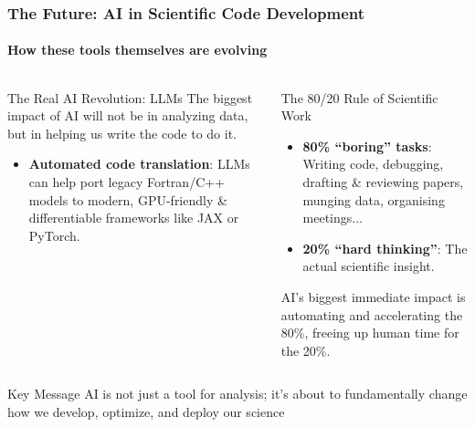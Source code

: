 \documentclass[aspectratio=169]{beamer}
\newcommand{\keyterm}[1]{\textbf{\textcolor{C0}{#1}}}
\begin{document}
\begin{frame}
    \frametitle{The Future: AI in Scientific Code Development}
    \framesubtitle{How these tools themselves are evolving}
    \vspace{-1em}
    \begin{columns}[T]
        \begin{block}{The Real AI Revolution: LLMs}
            The biggest impact of AI will not be in analyzing data, but in helping us write the code to do it.
            \begin{itemize}
                \item \keyterm{Automated code translation}: LLMs can help port legacy Fortran/C++ models to modern, GPU-friendly \& differentiable frameworks like JAX or PyTorch.
            \end{itemize}
        \end{block}
        \begin{block}{The 80/20 Rule of Scientific Work}
            \begin{itemize}
                \item \textbf{80\% ``boring'' tasks}: Writing code, debugging, drafting \& reviewing papers, munging data, organising meetings...
                \item \textbf{20\% ``hard thinking''}: The actual scientific insight.
            \end{itemize}
            AI's biggest immediate impact is automating and accelerating the 80\%, freeing up human time for the 20\%.
        \end{block}
    \end{columns}
    \begin{alertblock}{Key Message}
        AI is not just a tool for analysis; it's about to fundamentally change how we develop, optimize, and deploy our science
    \end{alertblock}
\end{frame}
\end{document}
